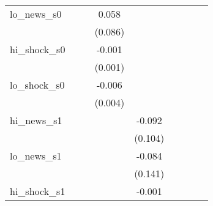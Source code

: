 {\begin{tabular}{l*{8}{c}}
\addlinespace
lo\_news\_s0  &                     &                     &       0.058         &                     &                     &                     &                     &                     \\
            &                     &                     &     (0.086)         &                     &                     &                     &                     &                     \\
\addlinespace
hi\_shock\_s0 &                     &                     &      -0.001         &                     &                     &                     &                     &                     \\
            &                     &                     &     (0.001)         &                     &                     &                     &                     &                     \\
\addlinespace
lo\_shock\_s0 &                     &                     &      -0.006         &                     &                     &                     &                     &                     \\
            &                     &                     &     (0.004)         &                     &                     &                     &                     &                     \\
\addlinespace
hi\_news\_s1  &                     &                     &                     &      -0.092         &                     &                     &                     &                     \\
            &                     &                     &                     &     (0.104)         &                     &                     &                     &                     \\
\addlinespace
lo\_news\_s1  &                     &                     &                     &      -0.084         &                     &                     &                     &                     \\
            &                     &                     &                     &     (0.141)         &                     &                     &                     &                     \\
\addlinespace
hi\_shock\_s1 &                     &                     &                     &      -0.001         &                     &                     &                     &                     \\

\end{tabular}}
